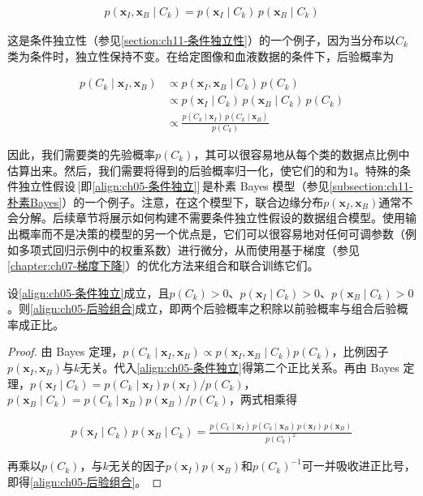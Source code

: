 \documentclass[../../main.tex]{subfiles}
\begin{document}
\begin{enumerate}[(1)]
  \begin{align}
    p(\boldsymbol{x}_{I},\boldsymbol{x}_{B}\mid C_k)=p(\boldsymbol{x}_{I}\mid C_k)\,p(\boldsymbol{x}_{B}\mid C_k)
    \label{align:ch05-条件独立}
  \end{align}

  这是条件独立性（参见\cref{section:ch11-条件独立性}）的一个例子，因为当分布以$C_k$类为条件时，独立性保持不变。在给定图像和血液数据的条件下，后验概率为

  \begin{align}
    p(C_k\mid\boldsymbol{x}_{I},\boldsymbol{x}_{B})&\propto p(\boldsymbol{x}_{I},\boldsymbol{x}_{B}\mid C_k)\,p(C_k)\nonumber\\
    &\propto p(\boldsymbol{x}_{I}\mid C_k)\,p(\boldsymbol{x}_{B}\mid C_k)\,p(C_k)\nonumber\\
    &\propto \frac{p(C_k\mid\boldsymbol{x}_{I})\,p(C_k\mid\boldsymbol{x}_{B})}{p(C_k)}
    \label{align:ch05-后验组合}
  \end{align}
\end{enumerate}

因此，我们需要类的先验概率$p(C_k)$，其可以很容易地从每个类的数据点比例中估算出来。然后，我们需要将得到的后验概率归一化，使它们的和为1。特殊的条件独立性假设\,[即\eqref{align:ch05-条件独立}]\,是朴素 Bayes 模型（参见\cref{subsection:ch11-朴素Bayes}）的一个例子。注意，在这个模型下，联合边缘分布$p(\boldsymbol{x}_{I},\boldsymbol{x}_{B})$通常不会分解。后续章节将展示如何构建不需要条件独立性假设的数据组合模型。使用输出概率而不是决策的模型的另一个优点是，它们可以很容易地对任何可调参数（例如多项式回归示例中的权重系数）进行微分，从而使用基于梯度（参见\cref{chapter:ch07-梯度下降}）的优化方法来组合和联合训练它们。

\begin{proposition}[条件独立性下的后验组合]\label{proposition:ch05-后验组合}
设\eqref{align:ch05-条件独立}成立，且$p(C_k)>0$、$p(\boldsymbol{x}_{I}\mid C_k)>0$、$p(\boldsymbol{x}_{B}\mid C_k)>0$。则\eqref{align:ch05-后验组合}成立，即两个后验概率之积除以前验概率与组合后验概率成正比。
\end{proposition}

\begin{proof}
由 Bayes 定理，$p(C_k\mid\boldsymbol{x}_{I},\boldsymbol{x}_{B})\propto p(\boldsymbol{x}_{I},\boldsymbol{x}_{B}\mid C_k)p(C_k)$，比例因子$p(\boldsymbol{x}_{I},\boldsymbol{x}_{B})$与$k$无关。代入\eqref{align:ch05-条件独立}得第二个正比关系。再由 Bayes 定理，$p(\boldsymbol{x}_{I}\mid C_k)=p(C_k\mid\boldsymbol{x}_{I})p(\boldsymbol{x}_{I})/p(C_k)$，$p(\boldsymbol{x}_{B}\mid C_k)=p(C_k\mid\boldsymbol{x}_{B})p(\boldsymbol{x}_{B})/p(C_k)$，两式相乘得

\begin{align}
  p(\boldsymbol{x}_{I}\mid C_k)\,p(\boldsymbol{x}_{B}\mid C_k)=\frac{p(C_k\mid\boldsymbol{x}_{I})\,p(C_k\mid\boldsymbol{x}_{B})\,p(\boldsymbol{x}_{I})\,p(\boldsymbol{x}_{B})}{p(C_k)^{2}}
\end{align}

再乘以$p(C_k)$，与$k$无关的因子$p(\boldsymbol{x}_{I})p(\boldsymbol{x}_{B})$和$p(C_k)^{-1}$可一并吸收进正比号，即得\eqref{align:ch05-后验组合}。
\end{proof}
\end{document}

